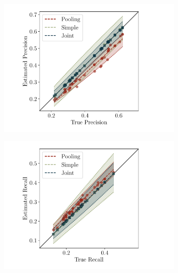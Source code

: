 \begin{figure}[t]
  \centering
  \begin{subfigure}{0.32\textwidth}
    \includegraphics[width=\textwidth,trim={1.5cm 0 1.5cm 0},clip]{figures/simulation/simulation-p}
    \caption{}
  \end{subfigure}
  \begin{subfigure}{0.32\textwidth}
    \includegraphics[width=\textwidth,trim={1.5cm 0 1.5cm 0},clip]{figures/simulation/simulation-r}
    \caption{}
  \end{subfigure}
  \begin{subfigure}{0.32\textwidth}
    
    \vfill
    \caption{\label{fig:evaluation-results}}
  \end{subfigure}


\end{figure}
